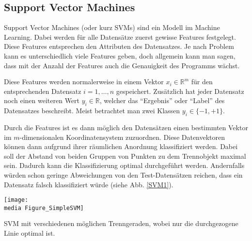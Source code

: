 \subsection{Support Vector Machines}
\label{sec:SVM}
Support Vector Machines (oder kurz SVMs) sind ein Modell im Machine Learning.
Dabei werden für alle Datensätze zuerst gewisse Features festgelegt. Diese Features entsprechen den Attributen des Datensatzes. Je nach Problem kann es unterschiedlich viele Features geben, doch allgemein kann man sagen, dass mit der Anzahl der Features auch die Genauigkeit des Programms wächst.

Diese Features werden normalerweise in einem Vektor $x_i\in \mathbb{R}^m$ für den entsprechenden Datensatz $i = 1, \dots, n$ gespeichert.
Zusätzlich hat jeder Datensatz noch einen weiteren Wert $y_{i} \in \mathbb{R}$, welcher das \enquote{Ergebnis} oder \enquote{Label} des Datensatzes beschreibt. Meist betrachtet man zwei Klassen $y_i \in \{-1, +1\}$.


Durch die Features ist es dann möglich den Datensätzen einen bestimmten Vektor im $m$-dimensionalen Koordinatensystem zuzuordnen. Diese Datenvektoren k\"onnen dann aufgrund ihrer räumlichen Anordnung klassifiziert werden. Dabei soll der Abstand von beiden Gruppen von Punkten zu dem Trennobjekt maximal sein. Dadurch kann die Klassifizierung optimal durchgeführt werden. Andernfalls würden schon geringe Abweichungen von den Test-Datensätzen reichen, dass ein Datensatz falsch klassifiziert würde (siehe Abb. \ref{SVM1}). 


\begin{dsafigure}
\begin{center}
	\label{SVM1}
	\texttt{[image: \\media Figure\_SimpleSVM]}
	\caption{SVM mit verschiedenen möglichen Trenngeraden, wobei nur die durchgezogene Linie optimal ist.}
	\end{center}
\end{dsafigure}


